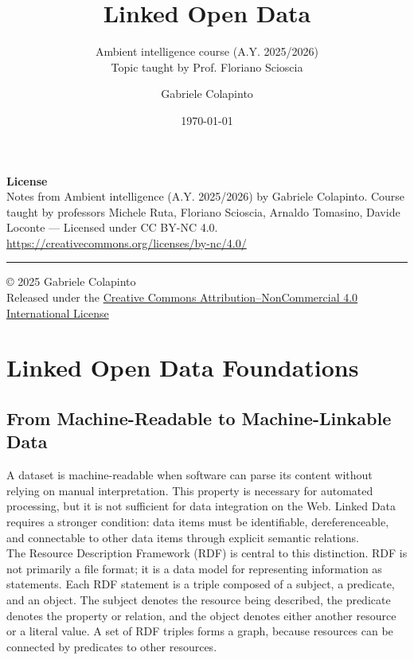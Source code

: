 \documentclass{scrbook}
\title{Linked Open Data}
\subtitle{Ambient intelligence course (A.Y. 2025/2026)\\Topic taught by Prof. Floriano Scioscia}
\author{Gabriele Colapinto}
\date{\today}
\begin{document}
	
	\maketitle
	\thispagestyle{empty}
	
	{\Large\textbf{License}} \\
	{Notes from Ambient intelligence (A.Y. 2025/2026) by Gabriele Colapinto. 
		Course taught by professors Michele Ruta, Floriano Scioscia, Arnaldo Tomasino, Davide Loconte — 
		Licensed under CC BY-NC 4.0.\\
		\url{https://creativecommons.org/licenses/by-nc/4.0/}}
	
	\vspace*{\fill}
	\rule{\textwidth}{0.2pt}
	\small{© 2025 Gabriele Colapinto \\
		Released under the \href{https://creativecommons.org/licenses/by-nc/4.0/}{Creative Commons Attribution–NonCommercial 4.0 International License}}
	
	\clearpage
	
	\tableofcontents
	
	\chapter{Linked Open Data Foundations}
	
	\section{From Machine-Readable to Machine-Linkable Data}
	
	A dataset is machine-readable when software can parse its content without relying on manual interpretation. This property is necessary for automated processing, but it is not sufficient for data integration on the Web. Linked Data requires a stronger condition: data items must be identifiable, dereferenceable, and connectable to other data items through explicit semantic relations.\\
	
	The Resource Description Framework (RDF) is central to this distinction. RDF is not primarily a file format; it is a data model for representing information as statements. Each RDF statement is a triple composed of a subject, a predicate, and an object. The subject denotes the resource being described, the predicate denotes the property or relation, and the object denotes either another resource or a literal value. A set of RDF triples forms a graph, because resources can be connected by predicates to other resources.\\
	
\end{document}
